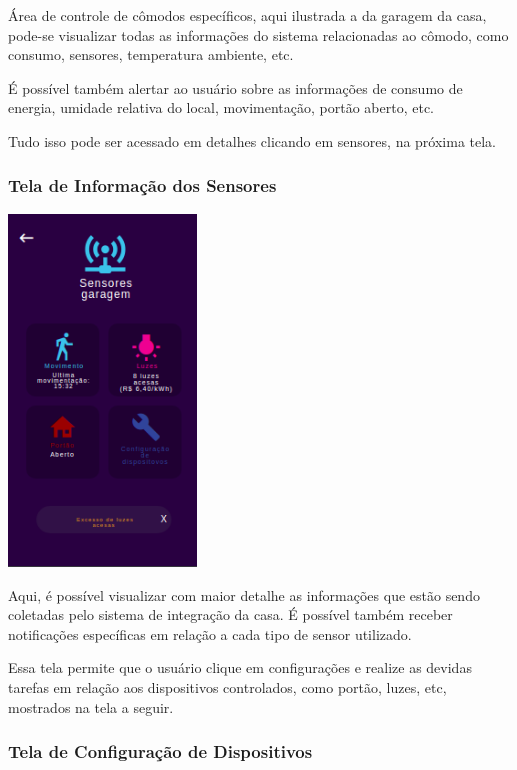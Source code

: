 \par Área de controle de cômodos específicos, aqui ilustrada a da garagem da casa, pode-se visualizar todas as informações do sistema relacionadas ao cômodo, como consumo, sensores, temperatura ambiente, etc.
\par É possível também alertar ao usuário sobre as informações de consumo de energia, umidade relativa do local, movimentação, portão aberto, etc.
\par Tudo isso pode ser acessado em detalhes clicando em sensores, na próxima tela.

\subsubsection{Tela de Informação dos Sensores}

\begin{center}
\includegraphics[width=5cm]{figuras/4}
\end{center}

\par Aqui, é possível visualizar com maior detalhe as informações que estão sendo coletadas pelo sistema de integração da casa. É possível também receber notificações específicas em relação a cada tipo de sensor utilizado.
\par Essa tela permite que o usuário clique em configurações e realize as devidas tarefas em relação aos dispositivos controlados, como portão, luzes, etc, mostrados na tela a seguir.

\subsubsection{Tela de Configuração de Dispositivos}

